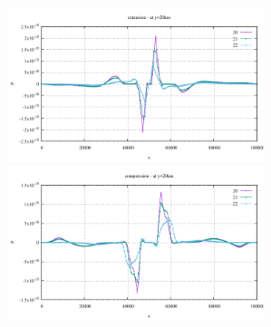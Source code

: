 \begin{center}
\includegraphics[width=7.5cm]{python_codes/fieldstone_70/results_vpstudy/exy_extension.pdf}
\includegraphics[width=7.5cm]{python_codes/fieldstone_70/results_vpstudy/exy_compression.pdf}\\
\end{center}




